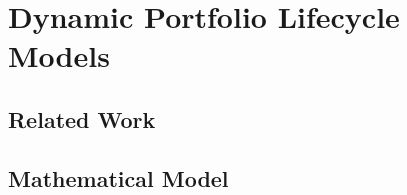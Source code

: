 \section{Dynamic Portfolio Lifecycle Models}
\label{sec:81models}

\blindtext{}



\subsection{Related Work}

\blindtext{}



\subsection{Mathematical Model}

\blindtext{}
